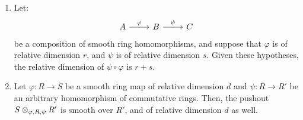             \begin{proposition} \label{prop: compositions_and_base_changes_of_smooth_morphisms}
                \noindent
                \begin{enumerate}
                    \item Let:
                        $$
                            \begin{tikzcd}
                            	A & B & C
                            	\arrow["\varphi", from=1-1, to=1-2]
                            	\arrow["\psi", from=1-2, to=1-3]
                            \end{tikzcd}
                        $$
                    be a composition of smooth ring homomorphisms, and suppose that $\varphi$ is of relative dimension $r$, and $\psi$ is of relative dimension $s$. Given these hypotheses, the relative dimension of $\psi \circ \varphi$ is $r + s$.
                    \item Let $\varphi: R \to S$ be a smooth ring map of relative dimension $d$ and $\psi: R \to R'$ be an arbitrary homomorphism of commutative rings. Then, the pushout $S \tensor_{\varphi, R, \psi} R'$ is smooth over $R'$, and of relative dimension $d$ as well. 
                \end{enumerate}
            \end{proposition}
